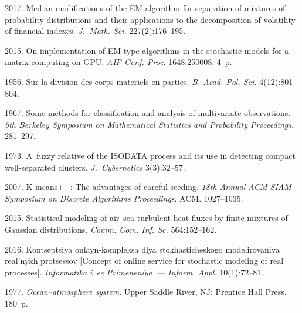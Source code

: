 \begin{multicols}{2}
{{\begin{thebibliography}{99}
 2017. Median modifications of the EM-algorithm for separation of
 mixtures of probability distributions and their applications 
 to the decomposition of volatility of financial indexes.
 \textit{J.~Math. Sci.} 227(2):176--195.

 2015. On implementation of EM-type algorithms 
in the stochastic models for a matrix computing on GPU. 
\textit{AIP Conf. Proc.} 1648:250008. 4~p.

 1956. Sur la division des corps materiels 
en parties. \textit{B. Acad. Pol. Sci.} 4(12):801--804.

 1967. Some methods for classification and analysis 
of multivariate observations. \textit{5th Berkeley Symposium on Mathematical 
Statistics and Probability Proceedings}. 281--297.

 1973. A~fuzzy relative of the ISODATA process and 
its use in detecting compact well-separated clusters. 
\textit{J.~Cybernetics} 3(3):32--57.

 2007. K-means++: The advantages of careful seeding. 
 \textit{18th Annual ACM-SIAM Symposium on Discrete Algorithms
 Proceedings}. ACM. 1027--1035.

 2015. Statistical modeling of air--sea turbulent heat fluxes by
  finite mixtures of Gaussian distributions. \textit{Comm. Com. Inf.
Sc.} 564:152--162.

 2016. Kontseptsiya onlayn-kompleksa 
dlya stokhasticheskogo modelirovaniya real'nykh pro\-tses\-sov 
[Concept of online service for stochastic modeling of real processes]. 
\textit{Informatika i~ee Primeneniya~--- Inform. Appl.} 10(1):72--81.

 1977. 
\textit{Ocean--atmosphere system}. Upper Saddle River, NJ: 
Prentice Hall Press. 180~p.
\end{thebibliography}

 }
 }

\end{multicols}

\vspace*{-6pt}

